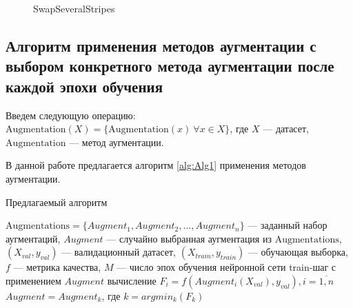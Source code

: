 \documentclass[12pt, fleqn]{article}
\begin{document}
\begin{enumerate}
\begin{figure}[ht!]
    	\caption{SwapSeveralStripes}
    	\label{fig:i2}
        \end{figure}
\end{enumerate}


\subsection{Алгоритм применения методов аугментации с выбором конкретного метода аугментации после каждой эпохи обучения}

Введем следующую операцию: \newline
$\text{Augmentation}(X) = \{\text{Augmentation}(x) \ \forall x \in X\}$, где $X$ --- датасет, \newline $\text{Augmentation}$ --- метод аугментации.

В данной работе предлагается алгоритм \ref{alg:Alg1} применения методов аугментации.

\algrenewcommand{}
\algrenewcommand{}

\begin{algorithm}
\caption{Предлагаемый алгоритм}\label{alg:Alg1}
\begin{algorithmic}
\State $\text{Augmentations} = \{Augment_1, Augment_2, ..., Augment_n\}$ --- заданный набор аугментаций,
\State $Augment$ --- случайно выбранная аугментация  из $\text{Augmentations}$,
\State $(X_{val}, y_{val})$ --- валидационный датасет, 
\State $(X_{train}, y_{train})$ --- обучающая выборка,
\State $f$ --- метрика качества,
\State $M$ --- число эпох обучения нейронной сети
\State train-шаг с применением $Augment$
\State вычисление $F_i = f(Augment_i(X_{val}), y_{val}), i = \overline{1,n}$
\State $Augment = Augment_k$, где $k = argmin_k(F_k)$
\EndFor
\end{algorithmic}
\end{algorithm}
\end{document}
